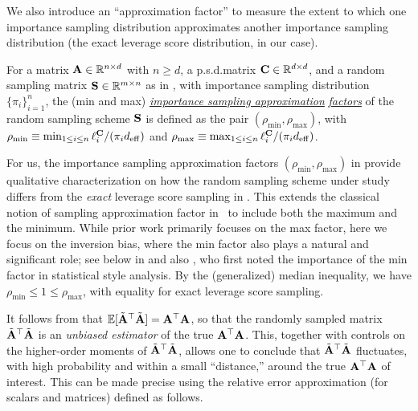\documentclass[11pt,a4paper]{article}
\begin{document}
We also introduce an ``approximation factor'' to measure the extent to which one importance sampling distribution approximates another importance sampling distribution (the exact leverage score distribution, in our case).%
\begin{definition}\label{def:approx_factor}
For a matrix $\A \in \RR^{n \times d}$ with $n \geq d$, a p.s.d.\@ matrix $\C \in \RR^{d \times d}$, and a random sampling matrix $\S \in \RR^{m\times n}$ as in , with importance sampling distribution $\{\pi_i \}_{i=1}^n$, the (min and max) \underline{\emph{importance sampling approximation}} \underline{\emph{factors}} of the random sampling scheme $\S$ is defined as the pair $(\rho_{\min}, \rho_{\max})$, with $\rho_{\min} \equiv \min_{1\leq i \leq n}\ell_i^{\C}/(\pi_i d_{\eff})$ and $\rho_{\max} \equiv \max_{1\leq i \leq n}\ell_i^{\C}/(\pi_i d_{\eff})$.
\end{definition}
For us, the importance sampling approximation factors $(\rho_{\min}, \rho_{\max})$ in  provide qualitative characterization on how the random sampling scheme under study differs from the \emph{exact} leverage score sampling in .
This extends the classical notion of  sampling approximation factor in~\citet{drineas2006fast1} to include both the maximum and the minimum.
While prior work primarily focuses on the max factor, here we focus on the inversion bias, where the min factor also plays a natural and significant role; see below in  and also \citet{ma2015statistical}, who first noted the importance of the min factor in statistical style analysis.
By the (generalized) median inequality, we have $\rho_{\min} \leq 1 \leq \rho_{\max}$, with equality for exact leverage score sampling.

It follows from  that $\EE[\tilde{\A}^\top \tilde{\A}] = \A^\top \A$, so that the randomly sampled matrix $\tilde \A^\top\tilde \A$ is an \emph{unbiased estimator} of the true $\A^\top \A$.
This, together with controls on the higher-order moments of $\tilde \A^\top\tilde \A$, allows one to conclude that $\tilde \A^\top\tilde \A$ fluctuates, with high probability and within a small ``distance,'' around the true $\A^\top \A$ of interest. 
This can be made precise using the relative error approximation (for scalars and matrices) defined as follows. 
\end{document}
